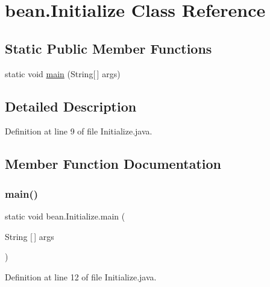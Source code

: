 \hypertarget{classbean_1_1Initialize}{}\section{bean.\+Initialize Class Reference}
\label{classbean_1_1Initialize}
\subsection*{Static Public Member Functions}
\begin{DoxyCompactItemize}
\item 
static void \mbox{\hyperlink{classbean_1_1Initialize_ac27694871d059edf0df3cdccc11f89ad}{main}} (String\mbox{[}$\,$\mbox{]} args)
\end{DoxyCompactItemize}


\subsection{Detailed Description}


Definition at line 9 of file Initialize.\+java.



\subsection{Member Function Documentation}
\mbox{\label{classbean_1_1Initialize_ac27694871d059edf0df3cdccc11f89ad}} 
\subsubsection{\texorpdfstring{main()}{main()}}
{\footnotesize\ttfamily static void bean.\+Initialize.\+main (\begin{DoxyParamCaption}\item[{String \mbox{[}$\,$\mbox{]}}]{args }\end{DoxyParamCaption})\hspace{0.3cm}{\ttfamily [static]}}



Definition at line 12 of file Initialize.\+java.


\begin{DoxyCode}{0}

\end{DoxyCode}


